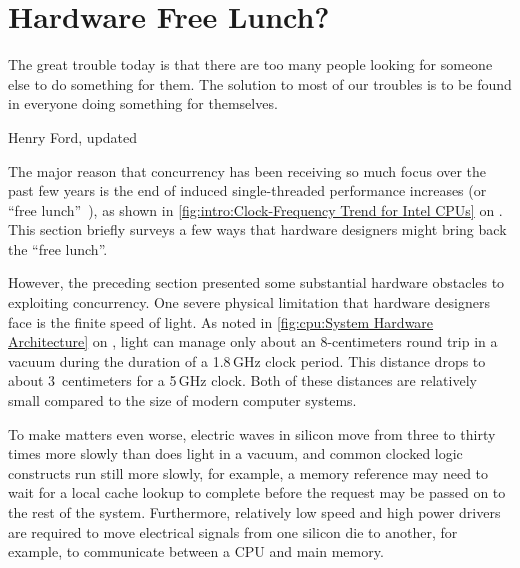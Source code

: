 
\section{Hardware Free Lunch?}
\label{sec:cpu:Hardware Free Lunch?}
%
\epigraph{The great trouble today is that there are too many people looking
	  for someone else to do something for them.
	  The solution to most of our troubles is to be found in everyone
	  doing something for themselves.}
	 {Henry Ford, updated}

The major reason that concurrency has been receiving so much focus over
the past few years is the end of 
induced single-threaded
performance increases
(or ``free lunch''~\cite{HerbSutter2008EffectiveConcurrency}),
as shown in
\cref{fig:intro:Clock-Frequency Trend for Intel CPUs} on
.
This section briefly surveys a few ways that hardware designers
might bring back the ``free lunch''.

However, the preceding section presented some substantial hardware
obstacles to exploiting concurrency.
One severe physical limitation that hardware designers face is the
finite speed of light.
As noted in
\cref{fig:cpu:System Hardware Architecture} on
,
light can manage only about an 8-centimeters round trip in a vacuum
during the duration of a 1.8\,GHz clock period.
This distance drops to about 3~centimeters for a 5\,GHz clock.
Both of these distances are relatively small compared to the size
of modern computer systems.

To make matters even worse, electric waves in silicon move from three to
thirty times more slowly than does light in a vacuum, and common
clocked logic constructs run still more slowly, for example, a
memory reference may need to wait for a local cache lookup to complete
before the request may be passed on to the rest of the system.
Furthermore, relatively low speed and high power drivers are required
to move electrical signals from one silicon die to another, for example,
to communicate between a CPU and main memory.

